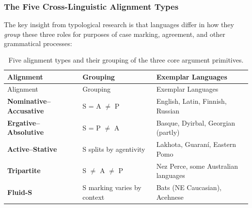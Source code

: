 \documentclass[
]{article}
\begin{document}
\subsubsection{The Five Cross-Linguistic Alignment
Types}\label{the-five-cross-linguistic-alignment-types}

The key insight from typological research is that languages differ in
how they \emph{group} these three roles for purposes of case marking,
agreement, and other grammatical processes:

\begin{longtable}[]{@{}
  >{\raggedright\arraybackslash}p{}
  >{\raggedright\arraybackslash}p{}
  >{\raggedright\arraybackslash}p{}@{}}
\caption{Five alignment types and their grouping of the three core
argument primitives.}\label{tbl:alignment-types}\tabularnewline
\toprule\noalign{}
\begin{minipage}[b]{\linewidth}\raggedright
Alignment
\end{minipage} & \begin{minipage}[b]{\linewidth}\raggedright
Grouping
\end{minipage} & \begin{minipage}[b]{\linewidth}\raggedright
Exemplar Languages
\end{minipage} \\
\midrule\noalign{}
\endfirsthead
\toprule\noalign{}
\begin{minipage}[b]{\linewidth}\raggedright
Alignment
\end{minipage} & \begin{minipage}[b]{\linewidth}\raggedright
Grouping
\end{minipage} & \begin{minipage}[b]{\linewidth}\raggedright
Exemplar Languages
\end{minipage} \\
\midrule\noalign{}
\endhead
\bottomrule\noalign{}
\endlastfoot
\textbf{Nominative--Accusative} & S = A \(\neq\) P & English, Latin,
Finnish, Russian \\
\textbf{Ergative--Absolutive} & S = P \(\neq\) A & Basque, Dyirbal,
Georgian (partly) \\
\textbf{Active--Stative} & S splits by agentivity & Lakhota, Guaraní,
Eastern Pomo \\
\textbf{Tripartite} & S \(\neq\) A \(\neq\) P & Nez Perce, some
Australian languages \\
\textbf{Fluid-S} & S marking varies by context & Bats (NE Caucasian),
Acehnese \\
\end{longtable}
\end{document}

